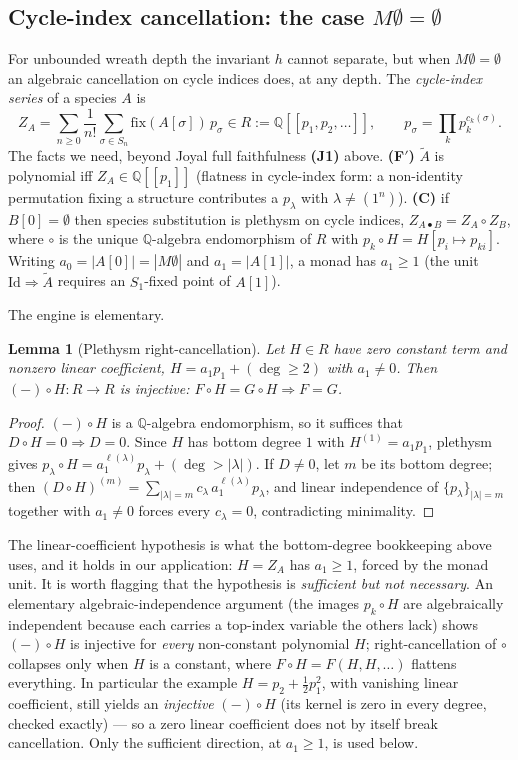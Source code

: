 \documentclass[11pt]{amsart}
\theoremstyle{plain}
\newtheorem{lemma}[theorem]{Lemma}
\theoremstyle{definition}
\newcommand{\Id}{\mathrm{Id}}
\begin{document}
\subsection{Cycle-index cancellation: the case $M\emptyset=\emptyset$}\label{sec:cancel}
For unbounded wreath depth the invariant $h$ cannot separate, but when $M\emptyset=\emptyset$ an
algebraic cancellation on cycle indices does, at any depth. The \emph{cycle-index series} of a species
$A$ is
\[
  Z_A=\sum_{n\ge0}\frac1{n!}\sum_{\sigma\in S_n}\mathrm{fix}(A[\sigma])\,p_\sigma\in
  R:=\mathbb Q[[p_1,p_2,\dots]],\qquad p_\sigma=\textstyle\prod_k p_k^{c_k(\sigma)}.
\]
The facts we need, beyond Joyal full faithfulness \textbf{(J1)} above. \textbf{(F$'$)} $\tilde A$ is
polynomial iff $Z_A\in\mathbb Q[[p_1]]$ (flatness in cycle-index form: a non-identity permutation fixing
a structure contributes a $p_\lambda$ with $\lambda\ne(1^n)$). \textbf{(C)} if $B[0]=\emptyset$ then
species substitution is plethysm on cycle indices, $Z_{A\bullet B}=Z_A\circ Z_B$, where $\circ$ is the
unique $\mathbb Q$-algebra endomorphism of $R$ with $p_k\circ H=H[p_i\mapsto p_{ki}]$. Writing
$a_0=|A[0]|=|M\emptyset|$ and $a_1=|A[1]|$, a monad has $a_1\ge1$ (the unit $\Id\Rightarrow\tilde A$
requires an $S_1$-fixed point of $A[1]$).

The engine is elementary.

\begin{lemma}[Plethysm right-cancellation]\label{lem:cancel}
Let $H\in R$ have zero constant term and nonzero linear coefficient, $H=a_1p_1+(\deg\ge2)$ with
$a_1\ne0$. Then $(-)\circ H\colon R\to R$ is injective: $F\circ H=G\circ H\Rightarrow F=G$.
\end{lemma}

\begin{proof}
$(-)\circ H$ is a $\mathbb Q$-algebra endomorphism, so it suffices that $D\circ H=0\Rightarrow D=0$.
Since $H$ has bottom degree $1$ with $H^{(1)}=a_1p_1$, plethysm gives $p_\lambda\circ
H=a_1^{\ell(\lambda)}p_\lambda+(\deg>|\lambda|)$. If $D\ne0$, let $m$ be its bottom degree; then
$(D\circ H)^{(m)}=\sum_{|\lambda|=m}c_\lambda\,a_1^{\ell(\lambda)}p_\lambda$, and linear independence of
$\{p_\lambda\}_{|\lambda|=m}$ together with $a_1\ne0$ forces every $c_\lambda=0$, contradicting
minimality.
\end{proof}

The linear-coefficient hypothesis is what the bottom-degree bookkeeping above uses, and it holds in our
application: $H=Z_A$ has $a_1\ge1$, forced by the monad unit. It is worth flagging that the hypothesis is
\emph{sufficient but not necessary}. An elementary algebraic-independence argument (the images
$p_k\circ H$ are algebraically independent because each carries a top-index variable the others lack)
shows $(-)\circ H$ is injective for \emph{every} non-constant polynomial $H$; right-cancellation of
$\circ$ collapses only when $H$ is a constant, where $F\circ H=F(H,H,\dots)$ flattens everything. In
particular the example $H=p_2+\tfrac12p_1^2$, with vanishing linear coefficient, still yields an
\emph{injective} $(-)\circ H$ (its kernel is zero in every degree, checked exactly) --- so a zero linear
coefficient does not by itself break cancellation. Only the sufficient direction, at $a_1\ge1$, is used
below.
\end{document}
